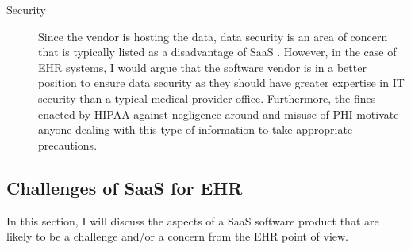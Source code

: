 \documentclass[10pt]{article}
\begin{document}
\begin{description}
\item[Security]
Since the vendor is hosting the data, data security is an area of concern that is typically listed as a disadvantage of SaaS \cite{wiki-saas}.
However, in the case of EHR systems, I would argue that the software vendor is in a better position to ensure data security as they should have greater expertise in IT security than a typical medical provider office.
Furthermore, the fines enacted by HIPAA against negligence around and misuse of PHI motivate anyone dealing with this type of information to take appropriate precautions.

\end{description}

\subsection{Challenges of SaaS for EHR}
\label{sec:SaaS Challenges}

In this section, I will discuss the aspects of a SaaS software product that are likely to be a challenge and/or a concern from the EHR point of view.
\end{document}
